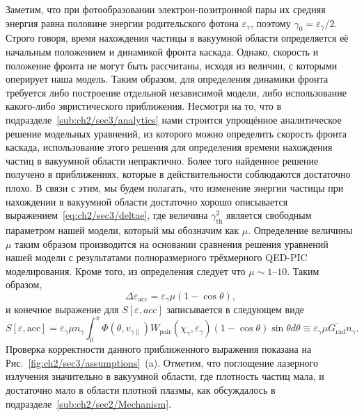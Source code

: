 Заметим, что при фотообразовании электрон-позитронной пары их средняя энергия равна половине энергии родительского фотона $\varepsilon_\gamma$, поэтому $\gamma_0 = \varepsilon_\gamma / 2$.
Строго говоря, время нахождения частицы в вакуумной области определяется её начальным положением и динамикой фронта каскада.
Однако, скорость и положение фронта не могут быть рассчитаны, исходя из величин, с которыми оперирует наша модель.
Таким образом, для определения динамики фронта требуется либо построение отдельной независимой модели, либо использование какого-либо эвристического приближения.
Несмотря на то, что в подразделе~\ref{sub:ch2/sec3/analytics} нами строится упрощённое аналитическое решение модельных уравнений, из которого можно определить скорость фронта каскада, использование этого решения для определения времени нахождения частиц в вакуумной области непрактично.
Более того найденное решение получено в приближениях, которые в действительности соблюдаются достаточно плохо.
В связи с этим, мы будем полагать, что изменение энергии частицы при нахождении в вакуумной области достаточно хорошо описывается выражением~\eqref{eq:ch2/sec3/deltae}, где величина $\gamma_\mathrm{th}^2$ является свободным параметром нашей модели, который мы обозначим как $\mu$.
Определение величины $\mu$ таким образом производится на основании сравнения решения уравнений нашей модели с результатами полноразмерного трёхмерного QED-PIC моделирования.
Кроме того, из определения следует что $\mu \sim \numrange{1}{10}$.
Таким образом, 
\begin{equation}
    \label{eq:ch2/sec3/deltae_fin}
    \Delta\varepsilon_\mathrm{acc} = \varepsilon_\gamma \mu (1 - \cos\theta),
\end{equation}
и конечное выражение для $S[\varepsilon,acc]$ записывается в следующем виде
\begin{equation}
    \label{eq:ch2/jE}
    S[\varepsilon, \mathrm{acc}] =  \varepsilon_\gamma \mu n_\gamma \int_0^\pi \Phi(\theta, v_{\gamma\parallel}) W_\mathrm{pair}(\chi_\gamma, \varepsilon_\gamma) {\left( 1-\cos\theta \right)}\sin\theta d\theta  \equiv \varepsilon_\gamma \mu \overline{G_\mathrm{rad}} n_\gamma.
\end{equation}
Проверка корректности данного приближенного выражения показана на Рис.~\ref{fig:ch2/sec3/assumptions}~(a).
Отметим, что поглощение лазерного излучения значительно в вакуумной области, где плотность частиц мала, и достаточно мало в области плотной плазмы, как обсуждалось в подразделе~\ref{sub:ch2/sec2/Mechanism}.
